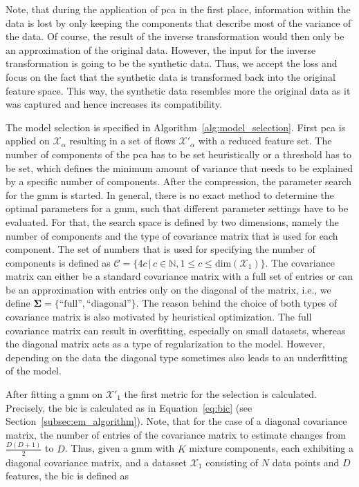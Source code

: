 \documentclass[../../main.tex]{subfiles}
\begin{document}
 Note, that during the application of \gls{pca} in the first place, information within the data is lost by only keeping the components that describe most of the variance of the data. Of course, the result of the inverse transformation would then only be an approximation of the original data. However, the input for the inverse transformation is going to be the synthetic data. Thus, we accept the loss and focus on the fact that the synthetic data is transformed back into the original feature space. This way, the synthetic data resembles more the original data as it was captured and hence increases its compatibility.
 
 The model selection is specified in Algorithm~\ref{alg:model_selection}. First \gls{pca} is applied on $\mathcal{X}_\alpha$ resulting in a set of flows $\mathcal{X}'_\alpha$ with a reduced feature set. The number of components of the \gls{pca} has to be set heuristically or a threshold has to be set, which defines the minimum amount of variance that needs to be explained by a specific number of components. After the compression, the parameter search for the \gls{gmm} is started. In general, there is no exact method to determine the optimal parameters for a \gls{gmm}, such that different parameter settings have to be evaluated. For that, the search space is defined by two dimensions, namely the number of components and the type of covariance matrix that is used for each component. The set of numbers that is used for specifying the number of components is defined as $\mathcal{C} = \{ 4c \, | \,  c\in \mathbb{N}, 1 \leq c \leq \text{dim}(\mathcal{X}_1) \}$. The covariance matrix can either be a standard covariance matrix with a full set of entries or can be an approximation with entries only on the diagonal of the matrix, i.e., we define $\bm{\Sigma} = \{\text{``full''}, \text{``diagonal''}\}$. The reason behind the choice of both types of covariance matrix is also motivated by heuristical optimization. The full covariance matrix can result in overfitting, especially on small datasets, whereas the diagonal matrix acts as a type of regularization to the model. However, depending on the data the diagonal type sometimes also leads to an underfitting of the model.

 After fitting a \gls{gmm} on $\mathcal{X}'_1$ the first metric for the selection is calculated. Precisely, the \gls{bic} is calculated as in Equation~\ref{eq:bic} (see Section~\ref{subsec:em_algorithm}). Note, that for the case of a diagonal covariance matrix, the number of entries of the covariance matrix to estimate changes from $\frac{D(D+1)}{2}$ to $D$. Thus, given a \gls{gmm} with $K$ mixture components, each exhibiting a diagonal covariance matrix, and a datasset $\mathcal{X}_1$ consisting of $N$ data points and $D$ features, the \gls{bic} is defined as
\end{document}
